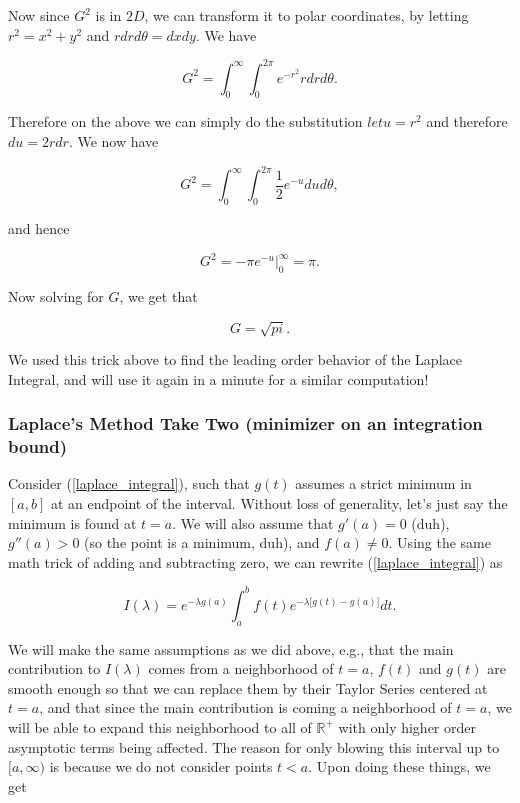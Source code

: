 Now since $G^2$ is in $2D$, we can transform it to polar coordinates, by letting $r^2 = x^2+y^2$ and $rdrd\theta = dxdy$. We have

$$G^2 =  \int_{0}^{\infty}  \int_{0}^{2\pi} e^{-r^2} rdrd\theta.$$

Therefore on the above we can simply do the substitution $let u = r^2$ and therefore $du = 2rdr$. We now have

$$G^2 =   \int_{0}^{\infty}  \int_{0}^{2\pi} \frac{1}{2} e^{-u} dud\theta,$$

and hence

$$G^2 = - \pi e^{-u} \bigg|_{0}^{\infty} = \pi.$$

Now solving for $G$, we get that 

$$G = \sqrt{pi}.$$

We used this trick above to find the leading order behavior of the Laplace Integral, and will use it again in a minute for a similar computation! 


%
%
\subsubsection{Laplace's Method Take Two (minimizer on an integration bound)}

Consider (\ref{laplace_integral}), such that $g(t)$ assumes a strict minimum in $[a,b]$ at an endpoint of the interval. Without loss of generality, let's just say the minimum is found at $t=a$. We will also assume that $g'(a)=0$ (duh), $g''(a)>0$ (so the point is a minimum, duh), and $f(a)\neq 0$. Using the same math trick of adding and subtracting zero, we can rewrite (\ref{laplace_integral}) as

$$I(\lambda) = e^{-\lambda g(a)} \int_a^b f(t) e^{ -\lambda\big[ g(t) - g(a) \big] } dt.$$

We will make the same assumptions as we did above, e.g., that the main contribution to $I(\lambda)$ comes from a neighborhood of $t=a$, $f(t)$ and $g(t)$ are smooth enough so that we can replace them by their Taylor Series centered at $t=a$, and that since the main contribution is coming a neighborhood of $t=a$, we will be able to expand this neighborhood to all of $\mathbb{R}^+$ with only higher order asymptotic terms being affected. The reason for only blowing this interval up to $[a,\infty)$ is because we do not consider points $t<a$. Upon doing these things, we get


